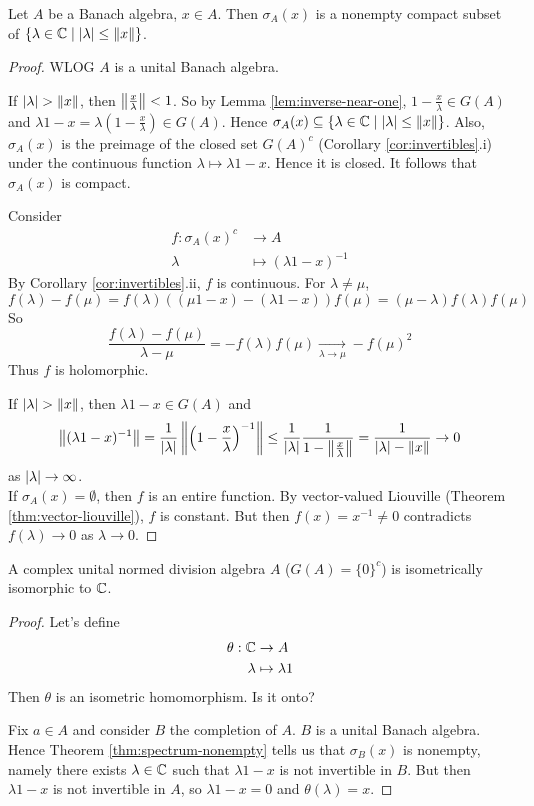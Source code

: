 \documentclass{article}
\begin{document}
\begin{thm}\label{thm:spectrum-nonempty}
  Let $A$ be a Banach algebra, $x \in A$. Then $\sigma_A(x)$ is a nonempty compact subset of $\{\lambda \in \mathbb C \mid \left\lvert \lambda\right\rvert \le \left\lVert x\right\rVert\}$.
\end{thm}
\begin{proof}
  WLOG $A$ is a unital Banach algebra.

  If $\left\lvert \lambda\right\rvert > \left\lVert x\right\rVert$, then $\left\lVert \frac x\lambda\right\rVert < 1$. So by Lemma \ref{lem:inverse-near-one}, $1 - \frac x\lambda \in G(A)$ and $\lambda1 - x = \lambda\left(1 - \frac x\lambda\right) \in G(A)$. Hence $\sigma_A(x) \subseteq \{\lambda \in \mathbb C \mid \left\lvert \lambda\right\rvert \le \left\lVert x\right\rVert\}$. Also, $\sigma_A(x)$ is the preimage of the closed set $G(A)^c$ (Corollary \ref{cor:invertibles}.i) under the continuous function $\lambda \mapsto \lambda1 - x$. Hence it is closed. It follows that $\sigma_A(x)$ is compact.

  Consider
  \begin{align*}
    f : \sigma_A(x)^c & \to A \\
    \lambda & \mapsto (\lambda 1 - x)^{-1}
  \end{align*}
  By Corollary \ref{cor:invertibles}.ii, $f$ is continuous. For $\lambda \ne \mu$,
  $$f(\lambda) - f(\mu) = f(\lambda)((\mu 1 - x) - (\lambda 1 - x))f(\mu) = (\mu - \lambda)f(\lambda)f(\mu)$$
  So
  $$\frac{f(\lambda) - f(\mu)}{\lambda - \mu} = -f(\lambda)f(\mu) \underset{\lambda \to \mu}\to -f(\mu)^2$$
  Thus $f$ is holomorphic.
  
  If $\left\lvert \lambda\right\rvert > \left\lVert x\right\rVert$, then $\lambda 1 - x \in G(A)$ and
  $$\left\lVert (\lambda 1 - x)^{-1}\right\rVert = \frac 1{\left\lvert \lambda\right\rvert}\left\lVert \left(1 - \frac x\lambda\right)^{-1}\right\rVert \le \frac 1{\left\lvert \lambda\right\rvert}\frac 1{1 - \left\lVert \frac x\lambda\right\rVert} = \frac 1{\left\lvert \lambda\right\rvert - \left\lVert x\right\rVert} \to 0$$
  as $\left\lvert \lambda\right\rvert \to \infty$. \\
  If $\sigma_A(x) = \emptyset$, then $f$ is an entire function. By vector-valued Liouville (Theorem \ref{thm:vector-liouville}), $f$ is constant. But then $f(x) = x^{-1} \ne 0$ contradicts $f(\lambda) \to 0$ as $\lambda \to 0$.
\end{proof}

\begin{cor}
  A complex unital normed division algebra $A$ ($G(A) = \{0\}^c$) is isometrically isomorphic to $\mathbb C$.
\end{cor}
\begin{proof}
  Let's define
  \begin{align*}
    \theta : \mathbb C & \to A \\
    \lambda & \mapsto \lambda 1
  \end{align*}
  Then $\theta$ is an isometric homomorphism. Is it onto?

  Fix $a \in A$ and consider $B$ the completion of $A$. $B$ is a unital Banach algebra. Hence Theorem \ref{thm:spectrum-nonempty} tells us that $\sigma_B(x)$ is nonempty, namely there exists $\lambda \in \mathbb C$ such that $\lambda 1 - x$ is not invertible in $B$. But then $\lambda 1 - x$ is not invertible in $A$, so $\lambda 1 - x = 0$ and $\theta(\lambda) = x$.
\end{proof}
\end{document}
